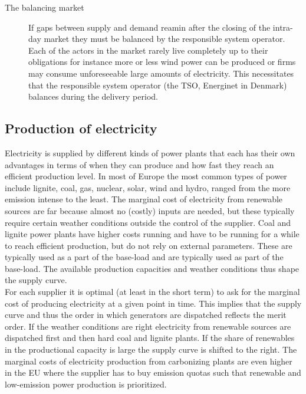 \begin{description}
    \item [The balancing market]
    If gaps between supply and demand reamin after the closing of the intra-day market they must be balanced by the responsible system operator. Each of the actors in the market rarely live completely up to their obligations for instance more or less wind power can be produced or firms may consume unforeseeable large amounts of electricity. This necessitates that the responsible system operator (the TSO, Energinet in Denmark) balances during the delivery period. %
    
\end{description}


\subsection{Production of electricity}
Electricity is supplied by different kinds of power plants that each has their own advantages in terms of when they can produce and how fast they reach an efficient production level. In most of Europe the most common types of power include lignite, coal, gas, nuclear, solar, wind and hydro, ranged from the more emission intense to the least. The marginal cost of electricity from renewable sources are far because almost no (costly) inputs are needed, but these typically require certain weather conditions outside the control of the supplier. Coal and lignite power plants have higher costs running and have to be running for a while to reach efficient production, but do not rely on external parameters. These are typically used as a part of the base-load  and are typically used as part of the base-load. The available production capacities and weather conditions thus shape the supply curve. \smallskip \\

For each supplier it is optimal (at least in the short term) to ask for the marginal cost of producing electricity at a given point in time. This implies that the supply curve and thus the order in which generators are dispatched reflects the merit order. If the weather conditions are right electricity from renewable sources are dispatched first and then hard coal and lignite plants. If the share of renewables in the productional capacity is large the supply curve is shifted to the right. The marginal costs of electricity production from carbonizing plants are even higher in the EU where the supplier has to buy emission quotas such that renewable and low-emission power production is prioritized. \smallskip \\

